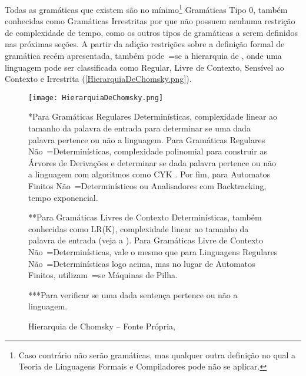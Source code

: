     Todas as gramáticas que existem são no mínimo\footnote{
    Caso contrário não serão gramáticas,
    mas qualquer outra definição no qual a Teoria de Linguagens Formais e
    Compiladores pode não se aplicar.
    }
    Gramáticas Tipo 0,
    também conhecidas como Gramáticas Irrestritas por que não possuem nenhuma restrição de complexidade de tempo,
    como os outros tipos de gramáticas a serem definidos nas próximas seções{}.
    A partir da adição restrições sobre a definição formal de gramática recém apresentada,
    também pode~=se  a hierarquia de ,
    onde uma linguagem pode ser classificada como Regular,
    Livre de Contexto,
    Sensível ao Contexto e
    Irrestrita (\autoref{HierarquiaDeChomsky.png}).
    \begin{figure}[h]
    \centering
    \texttt{[image: HierarquiaDeChomsky.png]}
    \begin{minipage}{\textwidth} \footnotesize
    *Para Gramáticas Regulares Determinísticas,
    complexidade linear ao tamanho da palavra de entrada para determinar se uma dada palavra pertence ou
    não a linguagem.
    Para Gramáticas Regulares Não~=Determinísticas,
    complexidade polinomial para construir as Árvores de Derivações e
    determinar se dada palavra pertence ou
    não a linguagem com algoritmos como CYK \cite{hopcroftBook,cykParsingAlgorithm}.
    Por fim,
    para Automatos Finitos Não~=Determinísticos ou
    Analisadores com Backtracking,
    tempo exponencial.

    **Para Gramáticas Livres de Contexto Determinísticas,
    também conhecidas como LR(K),
    complexidade linear ao tamanho da palavra de entrada (veja a ).
    Para Gramáticas Livre de Contexto Não~=Determinísticas,
    vale o mesmo que para Linguagens Regulares Não~=Determinísticas logo acima,
    mas no lugar de Automatos Finitos,
    utilizam~=se Máquinas de Pilha.

    ***Para verificar se uma dada sentença pertence ou não a linguagem.
    \end{minipage}
    \caption[Hierarquia de Chomsky]{Hierarquia de Chomsky -- Fonte Própria\protect\footnotemark,
    }
    \label{HierarquiaDeChomsky.png}
    \end{figure}


